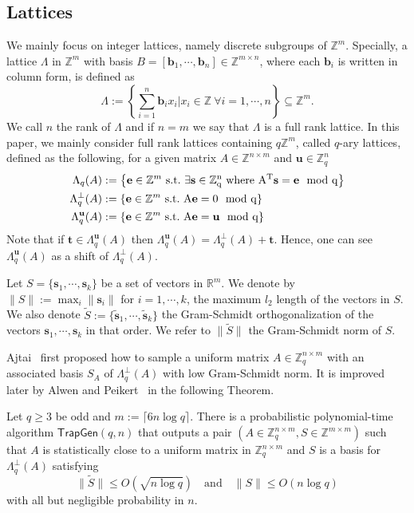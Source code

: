 \documentclass[runningheads,10pt]{llncs}
\def\ZZ{\mathbb{Z}}
\def\bf{\mathbf}
\def\TrapGen{\mathsf{TrapGen}}
\def\e{\bf{e}}
\def\L{\Lambda}
\def\Lp{\Lambda^{\perp}}
\def\b{\bf{b}}
\def\s{\bf{s}}
\begin{document}
\subsection{Lattices}
We mainly focus on integer lattices, namely discrete subgroups of $\ZZ^m$. Specially, a lattice $\Lambda$ in $\ZZ^m$ with basis $B=[\b_1,\cdots,\b_n]\in\ZZ^{m\times n}$, where each $\b_i$ is written in column form, is defined as
$$\Lambda:=\left\{\sum_{i=1}^n\b_ix_i | x_i\in\ZZ~\forall i=1,\cdots,n \right\}\subseteq\ZZ^m.$$
We call $n$ the rank of $\L$ and if $n=m$ we say that $\L$ is a full rank lattice. In this paper, we mainly consider full rank lattices containing $q\ZZ^m$, called $q$-ary lattices, defined as the following, for a given matrix $A\in\ZZ^{n\times m}$ and $\bf{u}\in\ZZ_q^n$
\begin{align*}
\L_q(A) &:= \left\{ \e\in\ZZ^m ~\rm{s.t.}~ \exists \bf{s}\in\ZZ_q^n~\rm{where}~A^T\bf{s}=\bf{e}\mod q \right\}\\
\Lp_q(A) &:= \left\{ \e\in\ZZ^m~\rm{s.t.}~A\e=0\mod q \right\} \\
\L_q^{\bf{u}}(A) &:=  \left\{ \e\in\ZZ^m~\rm{s.t.}~A\e=\bf{u}\mod q \right\}
\end{align*}
Note that if $\bf{t}\in\L_q^{\bf{u}}(A)$ then $\L_q^{\bf{u}}(A)=\Lp_q(A)+\bf{t}$. Hence, one can see $\L_q^{\bf{u}}(A)$ as a shift of $\Lp_q(A)$.

Let $S=\{\s_1,\cdots,\s_k\}$ be a set of vectors in $\mathbb{R}^m$. We denote by $\|S\|:=\max_i\|\s_i\|$ for $i=1,\cdots,k$, the maximum $l_2$ length of the vectors in $S$. We also denote $\tilde{S}:=\{\tilde{\s}_1,\cdots,\tilde{\s}_k \}$ the Gram-Schmidt orthogonalization of the vectors $\s_1,\cdots,\s_k$ in that order. We refer to $\|\tilde{S}\|$ the Gram-Schmidt norm of $S$.

Ajtai~\cite{Ajtai99} first proposed how to sample a uniform matrix $A\in\ZZ_q^{n\times m}$ with an associated basis $S_A$ of $\Lp_q(A)$ with low Gram-Schmidt norm. It is improved later by Alwen and Peikert~\cite{AP09} in the following Theorem.

\begin{theorem}\label{thm:TrapGen}
	Let $q\geq 3$ be odd and $m:=\lceil 6n\log q\rceil$. There is a probabilistic polynomial-time algorithm $\TrapGen(q,n)$ that outputs a pair $(A\in\ZZ_q^{n\times m},S\in\ZZ^{m\times m})$ such that $A$ is statistically close to a uniform matrix in $\ZZ_q^{n\times m}$ and $S$ is a basis for $\Lp_q(A)$ satisfying
	\[\|\tilde{S}\|\leq O(\sqrt{n\log q})\quad\text{and}\quad\|S\|\leq O(n\log q)\]
	with all but negligible probability in $n$.
\end{theorem}
\end{document}
